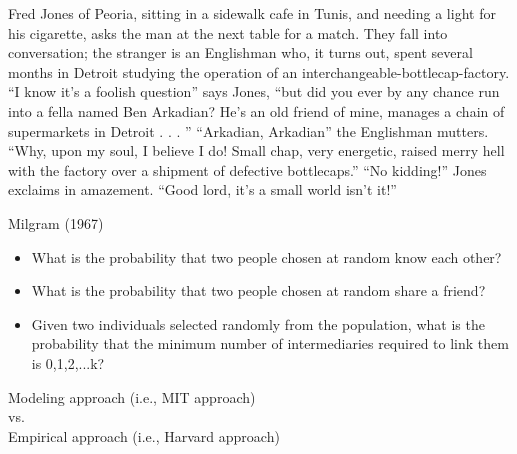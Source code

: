 \documentclass[aspectratio=169]{beamer}
\begin{document}
\begin{frame}

Fred Jones of Peoria, sitting in a sidewalk cafe in Tunis, and needing a light for his cigarette, asks the man at the next table for a match. They fall into conversation; the stranger is an Englishman who, it turns out, spent several months in Detroit studying the operation of an interchangeable-bottlecap-factory. ``I know it's a foolish question'' says Jones, ``but did you ever by any chance run into a fella named Ben Arkadian? He's an old friend of mine, manages a chain of supermarkets in Detroit . . . '' ``Arkadian, Arkadian'' the Englishman mutters. ``Why, upon my soul, I believe I do! Small chap, very energetic, raised merry hell with the factory over a shipment of defective bottlecaps.'' ``No kidding!'' Jones exclaims in amazement. ``Good lord, it's a small world isn't it!''

\vfill
Milgram (1967)
\end{frame}
\begin{frame}

\begin{itemize}
\item What is the probability that two people chosen at random know each other?
\pause
\item What is the probability that two people chosen at random share a friend?
\pause
\item Given two individuals selected randomly from the population, what is the probability that the minimum number of intermediaries required to link them is 0,1,2,...k?
\end{itemize}

\end{frame}
\begin{frame}

\begin{center}
Modeling approach (i.e., MIT approach)\\
  vs.\\
Empirical approach (i.e., Harvard approach)
\end{center}


\end{frame}
\end{document}
